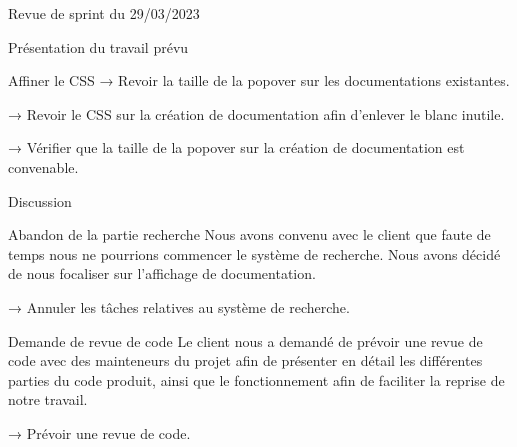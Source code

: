 \documentclass[]{article}
\begin{document}
{\begin{section}{Revue de sprint du 29/03/2023}
\begin{subsection}{Présentation du travail prévu}
\begin{subsubsection}{Affiner le CSS}
         → Revoir la taille de la popover sur les documentations existantes.

         → Revoir le CSS sur la création de documentation afin d’enlever le blanc inutile.

         → Vérifier que la taille de la popover sur la création de documentation est convenable.
     \end{subsubsection}
 \end{subsection}

 \begin{subsection}{Discussion}
     \begin{subsubsection}{Abandon de la partie recherche}
         Nous avons convenu avec le client que faute de temps nous ne pourrions commencer le système de recherche. Nous avons décidé de nous focaliser sur l’affichage de documentation.

         → Annuler les tâches relatives au système de recherche.
     \end{subsubsection}

     \begin{subsubsection}{Demande de revue de code}
         Le client nous a demandé de prévoir une revue de code avec des mainteneurs du projet afin de présenter en détail les différentes parties du code produit, ainsi que le fonctionnement afin de faciliter la reprise de notre travail.

         → Prévoir une revue de code.
     \end{subsubsection}
 \end{subsection}
\end{section}
}
\end{document}
